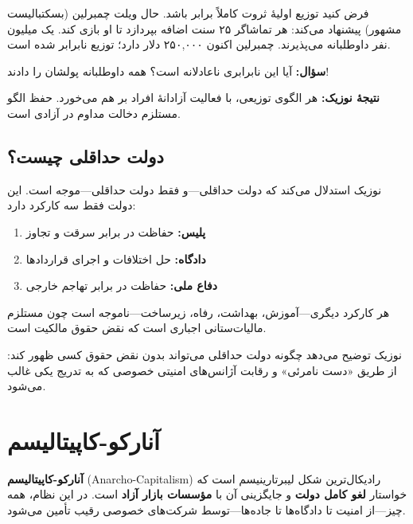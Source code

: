 \begin{tcolorbox}[
    enhanced,
    colback=centergreen!10,
    colframe=centergreen,
    boxrule=1.5pt,
    arc=5pt,
    fonttitle=\bfseries,
    title={\rl{🟢 استدلال نوزیک: مثال ویلت چمبرلین}}
]
فرض کنید توزیع اولیهٔ ثروت کاملاً برابر باشد. حال ویلت چمبرلین (بسکتبالیست مشهور) پیشنهاد می‌کند: هر تماشاگر ۲۵ سنت اضافه بپردازد تا او بازی کند. یک میلیون نفر داوطلبانه می‌پذیرند. چمبرلین اکنون ۲۵۰,۰۰۰ دلار دارد؛ توزیع نابرابر شده است.

\textbf{سؤال:} آیا این نابرابری ناعادلانه است؟ همه داوطلبانه پولشان را دادند!

\textbf{نتیجهٔ نوزیک:} هر الگوی توزیعی، با فعالیت آزادانهٔ افراد بر هم می‌خورد. حفظ الگو مستلزم دخالت مداوم در آزادی است.
\end{tcolorbox}

\subsection{دولت حداقلی چیست؟}


نوزیک استدلال می‌کند که دولت حداقلی—و فقط دولت حداقلی—موجه است. این دولت فقط سه کارکرد دارد:

\begin{enumerate}
    \item \textbf{پلیس:} حفاظت در برابر سرقت و تجاوز
    \item \textbf{دادگاه:} حل اختلافات و اجرای قراردادها
    \item \textbf{دفاع ملی:} حفاظت در برابر تهاجم خارجی
\end{enumerate}

هر کارکرد دیگری—آموزش، بهداشت، رفاه، زیرساخت—ناموجه است چون مستلزم مالیات‌ستانی اجباری است که نقض حقوق مالکیت است.

نوزیک توضیح می‌دهد چگونه دولت حداقلی می‌تواند بدون نقض حقوق کسی ظهور کند: از طریق «دست نامرئی» و رقابت آژانس‌های امنیتی خصوصی که به تدریج یکی غالب می‌شود.

\section{آنارکو-کاپیتالیسم}

\begin{tcolorbox}[
    enhanced,
    colback=rightblue!8,
    colframe=rightblue,
    boxrule=1.5pt,
    arc=5pt,
    fonttitle=\bfseries,
    title={\rl{🔵 تعریف کلیدی: آنارکو-کاپیتالیسم}}
]
\textbf{آنارکو-کاپیتالیسم} (Anarcho-Capitalism) رادیکال‌ترین شکل لیبرتارینیسم است که خواستار \textbf{لغو کامل دولت} و جایگزینی آن با \textbf{مؤسسات بازار آزاد} است. در این نظام، همه چیز—از امنیت تا دادگاه‌ها تا جاده‌ها—توسط شرکت‌های خصوصی رقیب تأمین می‌شود.
\end{tcolorbox}

